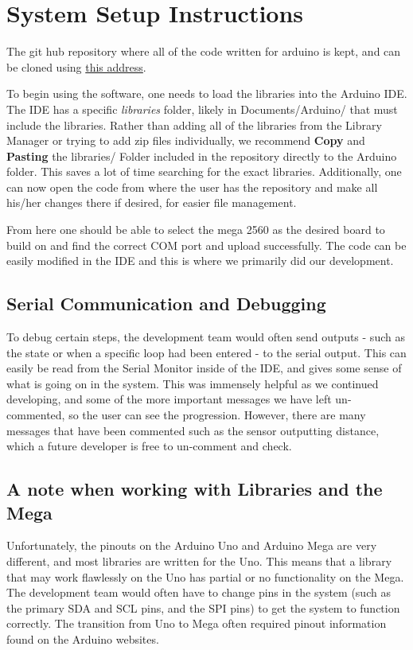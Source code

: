 \documentclass{article}
\begin{document}
\section{System Setup Instructions}
The git hub repository where all of the code written for arduino is kept, and can be cloned using \href{https://github.com/langley2119/Embedded_System_SmartWalker.git}{this address}. 


To begin using the software, one needs to load the libraries into the Arduino IDE. The IDE has a specific \textsl{libraries} folder, likely in Documents/Arduino/ that must include the libraries. Rather than adding all of the libraries from the Library Manager or trying to add zip files individually, we recommend \textbf{Copy} and \textbf{Pasting} the libraries/ Folder included in the repository directly to the Arduino folder. This saves a lot of time searching for the exact libraries. Additionally, one can now open the code from where the user has the repository and make all his/her changes there if desired, for easier file management.  

From here one should be able to select the mega 2560 as the desired board to build on and find the correct COM port and upload successfully. The code can be easily modified in the IDE and this is where we primarily did our development.

\subsection{Serial Communication and Debugging}
To debug certain steps, the development team would often send outputs - such as the state or when a specific loop had been entered - to the serial output. This can easily be read from the Serial Monitor inside of the IDE, and gives some sense of what is going on in the system. This was immensely helpful as we continued developing, and some of the more important messages we have left un-commented, so the user can see the progression. However, there are many messages that have been commented such as the sensor outputting distance, which a future developer is free to un-comment and check. 

\subsection{A note when working with Libraries and the Mega}
Unfortunately, the pinouts on the Arduino Uno and Arduino Mega are very different, and most libraries are written for the Uno. This means that a library that may work flawlessly on the Uno has partial or no functionality on the Mega. The development team would often have to change pins in the system (such as the primary SDA and SCL pins, and the SPI pins) to get the system to function correctly. The transition from Uno to Mega often required pinout information found on the Arduino websites.
\end{document}
